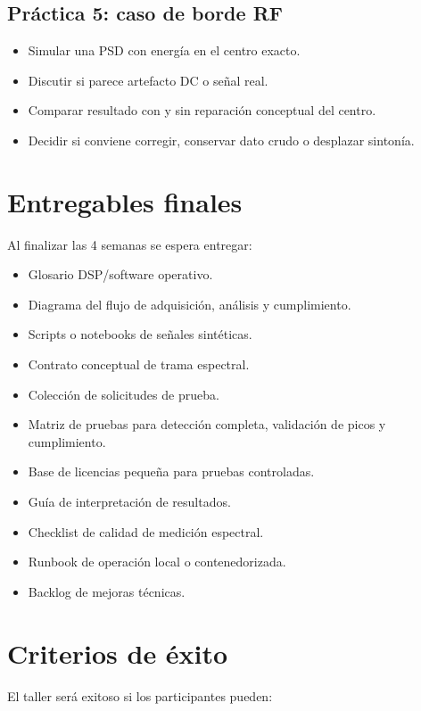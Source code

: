 \documentclass[11pt,a4paper]{article}
\begin{document}
\subsection*{Práctica 5: caso de borde RF}

\begin{itemize}
  \item Simular una PSD con energía en el centro exacto.
  \item Discutir si parece artefacto DC o señal real.
  \item Comparar resultado con y sin reparación conceptual del centro.
  \item Decidir si conviene corregir, conservar dato crudo o desplazar sintonía.
\end{itemize}

\section*{Entregables finales}

Al finalizar las 4 semanas se espera entregar:

\begin{itemize}
  \item Glosario DSP/software operativo.
  \item Diagrama del flujo de adquisición, análisis y cumplimiento.
  \item Scripts o notebooks de señales sintéticas.
  \item Contrato conceptual de trama espectral.
  \item Colección de solicitudes de prueba.
  \item Matriz de pruebas para detección completa, validación de picos y cumplimiento.
  \item Base de licencias pequeña para pruebas controladas.
  \item Guía de interpretación de resultados.
  \item Checklist de calidad de medición espectral.
  \item Runbook de operación local o contenedorizada.
  \item Backlog de mejoras técnicas.
\end{itemize}

\section*{Criterios de éxito}

El taller será exitoso si los participantes pueden:
\end{document}
